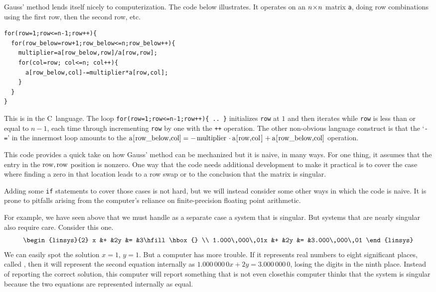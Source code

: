 Gauss' method lends itself nicely to computerization.
The code below illustrates.
It operates on an $n \! \times \! n$ matrix \texttt{a}, 
doing row combinations using the first row, then
the second row, etc.
\begin{lstlisting}
for(row=1;row<=n-1;row++){
  for(row_below=row+1;row_below<=n;row_below++){
    multiplier=a[row_below,row]/a[row,row];
    for(col=row; col<=n; col++){
      a[row_below,col]-=multiplier*a[row,col];
    }
  }
}
\end{lstlisting}
This is in the C~language.
The loop 
\lstinline!for(row=1;row<=n-1;row++){ .. }!
initializes \texttt{row} at $1$ and then iterates while
\texttt{row} is less than or equal to $n-1$, each time through
incrementing \lstinline!row! by one with the 
\lstinline!++! operation.
The other non-obvious language 
construct is that the `\texttt{-=}' in the innermost
loop amounts to the
$\text{\lstinline!a[row\_below,col]!}=
           -\text{\lstinline!multiplier!}\cdot\text{\lstinline!a[row,col]!}
           +\text{\lstinline!a[row\_below,col]!}$
operation.

This code provides a quick take on how Gauss' method can be
mechanized but it is naive, in many ways.
For one thing, it assumes that 
the entry in the
$\text{\lstinline!row!},\text{\lstinline!row!}$ position is nonzero.
One way that the code needs additional development to make it practical
is to cover
the case where finding a zero in that location leads to a row swap or to the
conclusion that the matrix is singular.

Adding some \lstinline!if! statements to cover those cases is not hard,
but we will instead consider some other ways in which the code is naive.
It is prone to pitfalls arising from the computer's reliance on 
finite-precision floating point arithmetic.

For example, we have seen above that we must handle as a separate case a
system that is singular.
But systems that are nearly singular also require care.
Consider this one.
\begin{equation*}
   \begin{linsys}{2}
                   x &+ &2y &= &3\hfill\hbox{}  \\
     1.000\,000\,01x &+ &2y &= &3.000\,000\,01
   \end{linsys}
\end{equation*}
We can easily spot the solution $x=1$, $y=1$.
But a computer has more trouble.
If it represents real numbers to eight significant places, called 
, 
then it will represent the second
equation internally as $1.000\,000\,0x+2y=3.000\,000\,0$, losing the
digits in the ninth place.
Instead of reporting the correct solution, this computer will report something
that is not even close\Dash this computer thinks that the system is singular
because the two equations are represented internally as equal.

